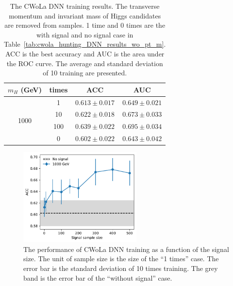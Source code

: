 \documentclass[12pt]{article}
\begin{document}
        \begin{table}[htpb]
            \centering
            \caption{The CWoLa DNN training results. The transverse momentum and invariant mass of Higgs candidates are removed from samples. 1 time and 0 times are the with signal and no signal case in Table~\ref{tab:cwola_hunting_DNN_results_wo_pt_m}. ACC is the best accuracy and AUC is the area under the ROC curve. The average and standard deviation of 10 training are presented.}
            \label{tab:cwola_hunting_DNN_results_wo_pt_m_enlarge_signal_size_deeper_model}
            \begin{tabular}{c|c|cc}
                $m_H$ (GeV)           & times & ACC               & AUC               \\ \hline
                \multirow{4}{*}{1000} & 1     & $0.613 \pm 0.017$ & $0.649 \pm 0.021$ \\
                                      & 10    & $0.622 \pm 0.018$ & $0.673 \pm 0.033$ \\
                                      & 100   & $0.639 \pm 0.022$ & $0.695 \pm 0.034$ \\
                                      & 0     & $0.602 \pm 0.022$ & $0.643 \pm 0.042$
            \end{tabular}
        \end{table}
        \begin{figure}[htpb]
            \centering
            \includegraphics[width=0.55\textwidth]{ACC_vs_signal_sample_size_deeper_model-1000GeV.pdf}
            \caption{The performance of CWoLa DNN training as a function of the signal size. The unit of sample size is the size of the ``1 times'' case. The error bar is the standard deviation of 10 times training. The grey band is the error bar of the ``without signal'' case.}
            \label{fig:cwola_hunting_DNN_results_wo_pt_m_various_signal_size_deeper_model_1000GeV}
        \end{figure}
\end{document}
